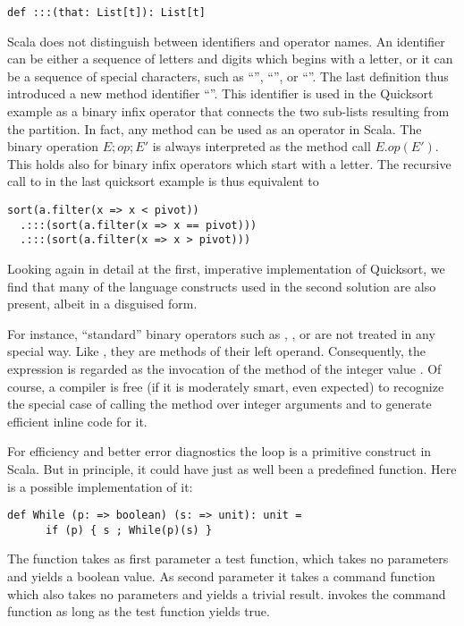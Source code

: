 \begin{lstlisting}
def :::(that: List[t]): List[t]
\end{lstlisting}

Scala does not distinguish between identifiers and operator names. An
identifier can be either a sequence of letters and digits which begins
with a letter, or it can be a sequence of special characters, such as
``\code{+}'', ``\code{*}'', or ``\code{:}''.  The last definition thus
introduced a new method identifier ``\code{:::}''.  This identifier is
used in the Quicksort example as a binary infix operator that connects
the two sub-lists resulting from the partition. In fact, any method
can be used as an operator in Scala.  The binary operation $E;op;E'$
is always interpreted as the method call $E.op(E')$. This holds also
for binary infix operators which start with a letter. The recursive call
to  in the last quicksort example is thus equivalent to
\begin{lstlisting}
sort(a.filter(x => x < pivot))
  .:::(sort(a.filter(x => x == pivot)))
  .:::(sort(a.filter(x => x > pivot)))
\end{lstlisting}

Looking again in detail at the first, imperative implementation of
Quicksort, we find that many of the language constructs used in the
second solution are also present, albeit in a disguised form.

For instance, ``standard'' binary operators such as \code{+},
\code{-}, or \code{<} are not treated in any special way. Like
, they are methods of their left operand. Consequently,
the expression  is regarded as the invocation
 of the \code{+} method of the integer value .
Of course, a compiler is free (if it is moderately smart, even expected)
to recognize the special case of calling the \code{+} method over
integer arguments and to generate efficient inline code for it.

For efficiency and better error diagnostics the  loop is a
primitive construct in Scala. But in principle, it could have just as
well been a predefined function. Here is a possible implementation of it:
\begin{lstlisting}
def While (p: => boolean) (s: => unit): unit =
      if (p) { s ; While(p)(s) }
\end{lstlisting}
The  function takes as first parameter a test function,
which takes no parameters and yields a boolean value. As second
parameter it takes a command function which also takes no parameters
and yields a trivial result.  invokes the command function
as long as the test function yields true. 


